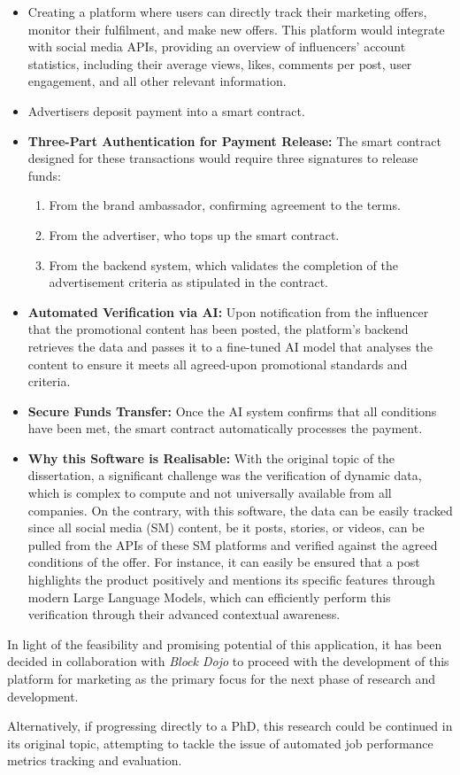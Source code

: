 \begin{itemize}
    \item Creating a platform where users can directly track their marketing offers, monitor their fulfilment, and make new offers. This platform would integrate with social media APIs, providing an overview of influencers'  account statistics, including their average views, likes, comments per post, user engagement, and all other relevant information.
    \item Advertisers deposit payment into a smart contract.
    \item \textbf{Three-Part Authentication for Payment Release:} The smart contract designed for these transactions would require three signatures to release funds:
    \begin{enumerate}
        \item From the brand ambassador, confirming agreement to the terms.
        \item From the advertiser, who tops up the smart contract.
        \item From the backend system, which validates the completion of the advertisement criteria as stipulated in the contract.
    \end{enumerate}
    \item \textbf{Automated Verification via AI:} Upon notification from the influencer that the promotional content has been posted, the platform's backend retrieves the data and passes it to a fine-tuned AI model that analyses the content to ensure it meets all agreed-upon promotional standards and criteria. 
    \item \textbf{Secure Funds Transfer:} Once the AI system confirms that all conditions have been met, the smart contract automatically processes the payment.
    \item \textbf{Why this Software is Realisable:} With the original topic of the dissertation, a significant challenge was the verification of dynamic data, which is complex to compute and not universally available from all companies. On the contrary, with this software, the data can be easily tracked since all social media (SM) content, be it posts, stories, or videos, can be pulled from the APIs of these SM platforms and verified against the agreed conditions of the offer. For instance, it can easily be ensured that a post highlights the product positively and mentions its specific features through modern Large Language Models, which can efficiently perform this verification through their advanced contextual awareness.
\end{itemize}

In light of the feasibility and promising potential of this application, it has been decided in collaboration with \textit{Block Dojo} to proceed with the development of this platform for marketing as the primary focus for the next phase of research and development.

Alternatively, if progressing directly to a PhD, this research could be continued in its original topic, attempting to tackle the issue of automated job performance metrics tracking and evaluation.